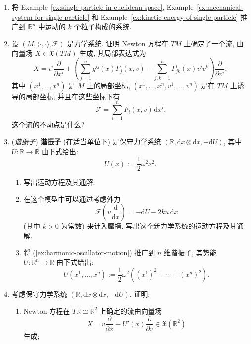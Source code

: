 \begin{RiemannExercise}\label{ex:mechanical-systems}
\begin{enumerate}[label=(\arabic*),ref=\arabic*,leftmargin=*]
\item\label{ex:mechanical-system-of-many-particles} 将 Example~\ref{ex:single-particle-in-euclidean-space}, Example~\ref{ex:mechanical-system-for-single-particle} 和 Example~\ref{ex:kinetic-energy-of-single-particle} 推广到 $\mathbb{R}^n$ 中运动的 $k$ 个粒子构成的系统.
\item\label{ex:vector-field-of-newton-flow} 设 $(M,\langle\cdot,\cdot\rangle,\mathcal{F})$ 是力学系统. 证明 Newton 方程在 $TM$ 上确定了一个流, 由向量场 $X\in\mathfrak{X}(TM)$ 生成, 其局部表达式为
\[
  X=v^i\frac{\partial}{\partial x^i}
  +\left(\sum_{j=1}^ng^{ij}(x)F_j(x,v)-\sum_{j,k=1}^n\Gamma^i_{jk}(x)v^jv^k\right)
    \frac{\partial}{\partial v^i},
\]
其中 $(x^1,\ldots,x^n)$ 是 $M$ 上的局部坐标, $(x^1,\ldots,x^n,v^1,\ldots,v^n)$ 是在 $TM$ 上诱导的局部坐标, 并且在这些坐标下有
\[
  \mathcal{F}=\sum_{i=1}^n F_i(x,v)\,\mathrm{d}x^i.
\]
这个流的不动点是什么?
\item\label{ex:harmonic-oscillator} (\emph{谐振子}) \textbf{谐振子} (在适当单位下) 是保守力学系统 $(\mathbb{R},\mathrm{d}x\otimes\mathrm{d}x,-\mathrm{d}U)$, 其中 $U:\mathbb{R}\to\mathbb{R}$ 由下式给出:
\[
  U(x):=\frac12\omega^2 x^2.
\]
\begin{enumerate}[label=(\alph*),ref=\alph*,leftmargin=*]
\item\label{ex:harmonic-oscillator-motion} 写出运动方程及其通解.
\item 在这个模型中可以通过考虑外力
\[
  \mathcal{F}\left(u\frac{\mathrm{d}}{\mathrm{d}x}\right)
    =-\mathrm{d}U-2ku\,\mathrm{d}x
\]
(其中 $k>0$ 为常数) 来计入摩擦. 写出这个新力学系统的运动方程及其通解.
\item 将 (\ref{ex:harmonic-oscillator-motion}) 推广到 $n$ 维谐振子, 其势能 $U:\mathbb{R}^n\to\mathbb{R}$ 由下式给出:
\[
  U(x^1,\ldots,x^n):=\frac12\omega^2\left((x^1)^2+\cdots+(x^n)^2\right).
\]
\end{enumerate}
\item\label{ex:one-dimensional-conservative-dynamics} 考虑保守力学系统 $(\mathbb{R},\mathrm{d}x\otimes\mathrm{d}x,-\mathrm{d}U)$. 证明:
\begin{enumerate}[label=(\alph*),leftmargin=*]
\item Newton 方程在 $T\mathbb{R}\cong\mathbb{R}^2$ 上确定的流由向量场
\[
  X=v\frac{\partial}{\partial x}-U'(x)\frac{\partial}{\partial v}\in\mathfrak{X}(\mathbb{R}^2)
\]
生成;

\end{enumerate}
\end{enumerate}
\end{RiemannExercise}
